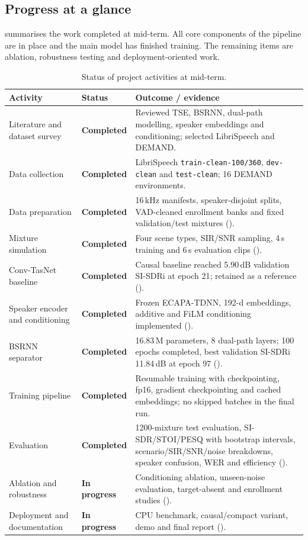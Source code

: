 \documentclass[11pt,a4paper]{article}
\newcommand{\sisdri}{SI-SDRi}
\newcommand{\done}{\textbf{Completed}}
\newcommand{\inprog}{\textbf{In progress}}
\begin{document}
\subsection{Progress at a glance}
\label{sec:status}
 summarises the work completed at mid-term. All core components of the pipeline
are in place and the main model has finished training. The remaining items are ablation,
robustness testing and deployment-oriented work.

\begin{table}[htbp]
\centering\footnotesize
\caption{Status of project activities at mid-term.}
\label{tab:status}
\begin{tabularx}{\textwidth}{@{}>{\raggedright\arraybackslash}p{4.0cm} l Y@{}}
\toprule
\textbf{Activity} & \textbf{Status} & \textbf{Outcome / evidence}\\
\midrule
Literature and dataset survey & \done &
  Reviewed TSE, BSRNN, dual-path modelling, speaker embeddings and conditioning; selected
  LibriSpeech and DEMAND.\\
Data collection & \done &
  LibriSpeech \texttt{train-clean-100/360}, \texttt{dev-clean} and \texttt{test-clean};
  16 DEMAND environments.\\
Data preparation & \done &
  16\,kHz manifests, speaker-disjoint splits, VAD-cleaned enrollment banks and fixed
  validation/test mixtures ().\\
Mixture simulation & \done &
  Four scene types, SIR/SNR sampling, 4\,s training and 6\,s evaluation clips
  ().\\
Conv-TasNet baseline & \done &
  Causal baseline reached 5.90\,dB validation \sisdri{} at epoch 21; retained as a reference
  ().\\
Speaker encoder and conditioning & \done &
  Frozen ECAPA-TDNN, 192-d embeddings, additive and FiLM conditioning implemented
  ().\\
BSRNN separator & \done &
  16.83\,M parameters, 8 dual-path layers; 100 epochs completed, best validation \sisdri{}
  11.84\,dB at epoch 97 ().\\
Training pipeline & \done &
  Resumable training with checkpointing, fp16, gradient checkpointing and cached embeddings;
  no skipped batches in the final run.\\
Evaluation & \done &
  1200-mixture test evaluation, SI-SDR/STOI/PESQ with bootstrap intervals, scenario/SIR/SNR/noise
  breakdowns, speaker confusion, WER and efficiency ().\\
Ablation and robustness & \inprog &
  Conditioning ablation, unseen-noise evaluation, target-absent and enrollment studies
  ().\\
Deployment and documentation & \inprog &
  CPU benchmark, causal/compact variant, demo and final report ().\\
\bottomrule
\end{tabularx}
\end{table}
\end{document}
